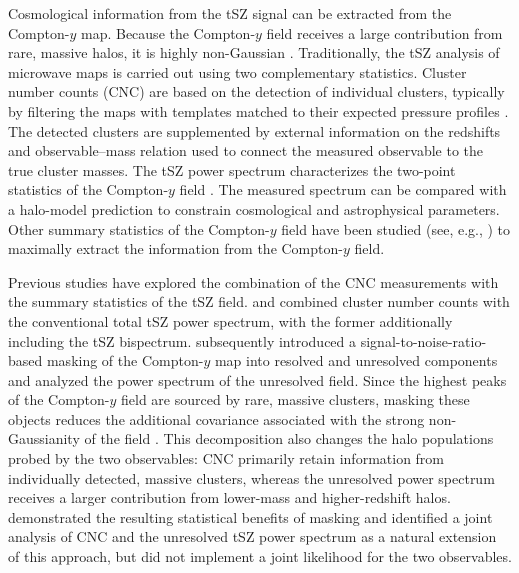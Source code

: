 \documentclass[aps,prd,twocolumn,superscriptaddress,nofootinbib,floatfix]{revtex4-2}
\begin{document}
Cosmological information from the tSZ signal can be extracted from the Compton-$y$ map. Because the Compton-$y$ field receives a large contribution from rare, massive halos, it is highly non-Gaussian \citep{Cooray2001,HillPajer2013}. Traditionally, the tSZ analysis of microwave maps is carried out using two complementary statistics. Cluster number counts (CNC) are based on the detection of individual clusters, typically by filtering the maps with templates matched to their expected pressure profiles \citep{Melin2006}. The detected clusters are supplemented by external information on the redshifts and observable--mass relation used to connect the measured observable to the true cluster masses. The tSZ power spectrum characterizes the two-point statistics of the Compton-$y$ field \citep{KomatsuSeljak2002,HillPajer2013}. The measured spectrum can be compared with a halo-model prediction to constrain cosmological and astrophysical parameters. Other summary statistics of the Compton-$y$ field have been studied (see, e.g., \citet{Sabyr:2025}) to maximally extract the information from the Compton-$y$ field.

Previous studies have explored the combination of the CNC measurements with the summary statistics of the tSZ field. \citet{Hurier:2017} and \citet{Salvati:2018} combined cluster number counts with the conventional total tSZ power spectrum, with the former additionally including the tSZ bispectrum. \citet{Rotti_2021} subsequently introduced a signal-to-noise-ratio-based masking of the Compton-$y$ map into resolved and unresolved components and analyzed the power spectrum of the unresolved field. Since the highest peaks of the Compton-$y$ field are sourced by rare, massive clusters, masking these objects reduces the additional covariance associated with the strong non-Gaussianity of the field \citep{OsatoTakada2021}. This decomposition also changes the halo populations probed by the two observables: CNC primarily retain information from individually detected, massive clusters, whereas the unresolved power spectrum receives a larger contribution from lower-mass and higher-redshift halos. \citet{Rotti_2021} demonstrated the resulting statistical benefits of masking and identified a joint analysis of CNC and the unresolved tSZ power spectrum as a natural extension of this approach, but did not implement a joint likelihood for the two observables.
\end{document}
